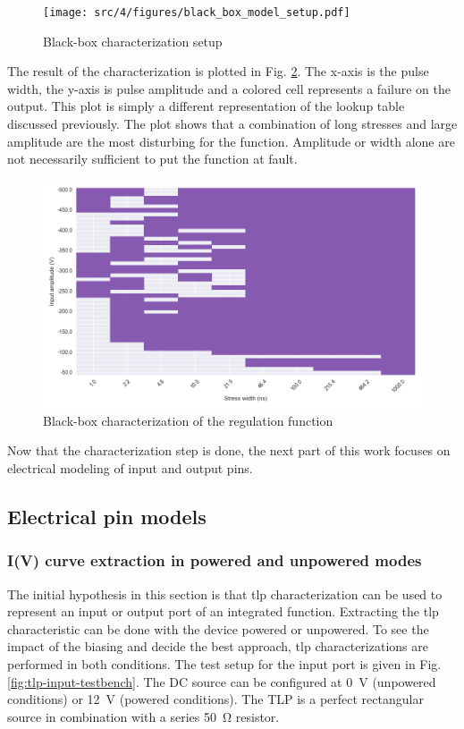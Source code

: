 \begin{figure}[!h]
  \centering
  \texttt{[image: src/4/figures/black\_box\_model\_setup.pdf]}
  \caption{Black-box characterization setup}
  \label{fig:cz-black-box-setup}
\end{figure}

The result of the characterization is plotted in Fig. \ref{fig:cz-black-box}.
The x-axis is the pulse width, the y-axis is pulse amplitude and a colored cell represents a failure on the output.
This plot is simply a different representation of the lookup table discussed previously.
The plot shows that a combination of long stresses and large amplitude are the most disturbing for the function.
Amplitude or width alone are not necessarily sufficient to put the function at fault.

\begin{figure}[!h]
  \centering
  \includegraphics[width=\textwidth]{src/4/figures/black_box_regulator.png}
  \caption{Black-box characterization of the regulation function}
  \label{fig:cz-black-box}
\end{figure}

Now that the characterization step is done, the next part of this work focuses on electrical modeling of input and output pins.

\subsection{Electrical pin models}
\subsubsection{I(V) curve extraction in powered and unpowered modes}

The initial hypothesis in this section is that \gls{tlp} characterization can be used to represent an input or output port of an integrated function.
Extracting the \gls{tlp} characteristic can be done with the device powered or unpowered.
To see the impact of the biasing and decide the best approach, \gls{tlp} characterizations are performed in both conditions.
The test setup for the input port is given in Fig. \ref{fig:tlp-input-testbench}.
The DC source can be configured at \SI{0}{\volt} (unpowered conditions) or \SI{12}{\volt} (powered conditions).
The TLP is a perfect rectangular source in combination with a series \SI{50}{\ohm} resistor.

